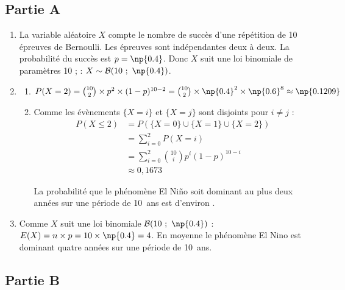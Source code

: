 \subsection*{Partie A}

\begin{enumerate}
	\item La variable aléatoire $X$ compte le nombre de succès d'une répétition de 10 épreuves de Bernoulli. Les épreuves sont indépendantes deux à deux. La probabilité du succès est $p=\np{0.4}$. Donc $X$ suit une loi binomiale de paramètres 10 ;  : $X \sim \mathcal{B}(10~;~\np{0.4})$.
	\item
		\begin{enumerate}
			\item $P(X = 2) = \binom{10}{2}\times p^2\times(1-p)^{10-2}= \binom{10}{2}\times\np{0.4}^{2}\times \np{0.6}^{8} \approx \np{0.1209}$
			\item Comme les évènements $\{X = i\}$ et $\{X = j\}$ sont disjoints pour $i \neq j$ :
\[
\begin{aligned}
P(X \leqslant 2)
&= P(\{X = 0\} \cup \{X = 1\} \cup \{X = 2\}) \\
&= \sum_{i=0}^{2} P(X=i) \\
&= \sum_{i=0}^{2}\binom{10}{i} p^{i}(1-p)^{10-i} \\
&\approx 0{,}1673
\end{aligned}
\]
			
			La probabilité que le phénomène El Niño soit dominant au plus deux années sur une période de 10~ans est d'environ .
		\end{enumerate}
	\item Comme $X$ suit une loi binomiale $\mathcal{B}(10~;~\np{0.4})$ : $E(X) = n\times p = 10 \times \np{0.4} = 4$. En moyenne le phénomène El Nino est dominant quatre années sur une période de 10~ans.
\end{enumerate}

\subsection*{Partie B}

